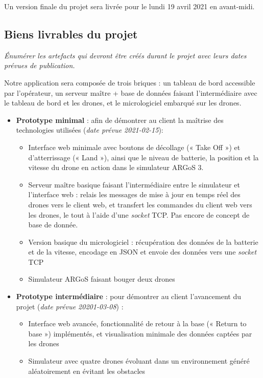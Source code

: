 \documentclass{mistcoursedoc}
\begin{document}
Un version finale du projet sera livrée pour le lundi 19 avril 2021 en avant-midi.

\subsection{Biens livrables du projet}
\textit{Énumérer les artefacts qui devront être créés durant le projet avec leurs dates prévues de publication.}


Notre application sera composée de trois briques : un tableau de bord accessible par l'opérateur, un serveur maître + base de données faisant l'intermédiaire avec le tableau de bord et les drones, et le micrologiciel embarqué sur les drones.
\begin{itemize}
  \item \textbf{Prototype minimal} : afin de démontrer au client la maîtrise des technologies utilisées (\textit{date prévue 2021-02-15}):
        \begin{itemize}
          \item Interface web minimale avec boutons de décollage (« Take Off ») et d’atterrissage (« Land »), ainsi que le niveau de batterie, la position et la vitesse du drone en action dans le simulateur ARGoS 3.
          \item Serveur maître basique faisant l’intermédiaire entre le simulateur et l’interface web : relais les messages de mise à jour en temps réel des drones vers le client web, et transfert les commandes du client web vers les drones, le tout à l'aide d'une \emph{socket} TCP. Pas encore de concept de base de donnée.
          \item Version basique du micrologiciel : récupération des données de la batterie et de la vitesse, encodage en JSON et envoie des données vers une \emph{socket} TCP
          \item Simulateur ARGoS faisant bouger deux drones
        \end{itemize}
  \item \textbf{Prototype intermédiaire} : pour démontrer au client l'avancement du projet (\textit{date prévue 20201-03-08}) :
        \begin{itemize}
          \item Interface web avancée, fonctionnalité de retour à la base (« Return to base ») implémentés, et visualisation minimale des données captées par les drones
          \item Simulateur avec quatre drones évoluant dans un environnement généré aléatoirement en évitant les obstacles

\end{itemize}
\end{itemize}
\end{document}
